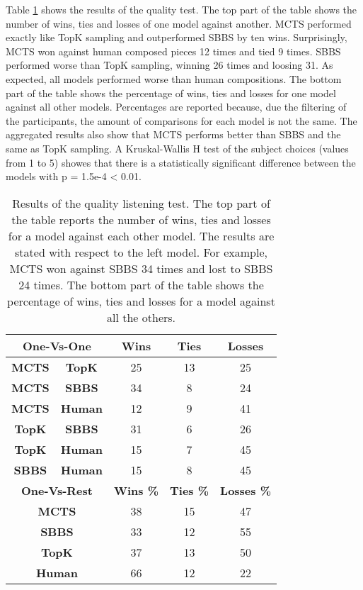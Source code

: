 Table \ref{tab:quality} shows the results of the quality test. The top part of the table shows the number of wins, ties and losses of one model against another.  MCTS performed exactly like TopK sampling and outperformed SBBS by ten wins. Surprisingly, MCTS won against human composed pieces 12 times and tied 9 times. SBBS performed worse than TopK sampling, winning 26 times and loosing 31. As expected, all models performed worse than human compositions. The bottom part of the table shows the percentage of wins, ties and losses for one model against all other models. Percentages are reported because, due the filtering of the participants, the amount of comparisons for each model is not the same. The aggregated results also show that
MCTS performs better than SBBS and the same as TopK sampling.
A Kruskal-Wallis H test of the subject choices (values from 1 to 5) showes that there is a statistically significant difference between the models with p = 1.5e-4 < 0.01.

\begin{table}[h]
    \centering
    \begin{tabular}{ccccc}
    \toprule
   \multicolumn{2}{c}{\textbf{One-Vs-One}} & \textbf{Wins} & \textbf{Ties} & \textbf{Losses} \\
    \midrule
    \textbf{MCTS} & \textbf{TopK } & 25 & 13 & 25 \\
    \textbf{MCTS} & \textbf{SBBS } & 34 & 8  & 24 \\
    \textbf{MCTS} & \textbf{Human} & 12 & 9  & 41 \\
    \textbf{TopK} & \textbf{SBBS } & 31 & 6  & 26 \\
    \textbf{TopK} & \textbf{Human} & 15 & 7  & 45 \\
    \textbf{SBBS} & \textbf{Human} & 15 & 8  & 45 \\
    \midrule
    \multicolumn{2}{c}{\textbf{One-Vs-Rest}} & \textbf{Wins \%} & \textbf{Ties \%} & \textbf{Losses \%}  \\
    \midrule
    \multicolumn{2}{c}{\textbf{MCTS}} & 38 & 15 & 47  \\
    \multicolumn{2}{c}{\textbf{SBBS}} & 33 & 12 & 55  \\
    \multicolumn{2}{c}{\textbf{TopK}} & 37 & 13 & 50 \\
    \multicolumn{2}{c}{\textbf{Human}} & 66 & 12 & 22 \\
    \bottomrule
    \end{tabular}
    \caption{Results of the quality listening test. The top part of the table reports the number of wins, ties and losses for a model against each other model. The results are stated with respect to the left model. For example, MCTS won against SBBS 34 times and lost to SBBS 24 times. The bottom part of the table shows the percentage of wins, ties and losses for a model against all the others.}
    \label{tab:quality}
\end{table}

